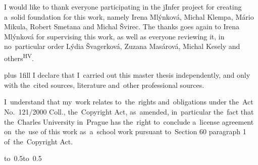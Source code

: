 \documentclass[a4paper,12pt,twoside,openright]{report}
\theoremstyle{definition}
\let\openright=\clearpage
\begin{document}
\newpage %
\openright

\cleardoublepage

\noindent
I would like to thank everyone participating in the jInfer project for creating a~solid foundation for this work, namely Irena Mlýn\-ko\-vá, Mi\-chal Klem\-pa, Má\-rio Mi\-ku\-la, Ro\-bert Sme\-ta\-na and Mi\-chal Švi\-rec. The thanks goes again to Irena Mlýn\-ko\-vá for supervising this work, as well as everyone reviewing it, in no~particular order Lý\-dia Šva\-ger\-ko\-vá, Zu\-za\-na Ma\-sá\-ro\-vá, Mi\-chal Ke\-se\-ly and others\textsuperscript{HV}.

\newpage %
\vglue 0pt plus 1fill
\noindent
I declare that I~carried out this master thesis independently, and only with the~cited sources, literature and~other professional sources.

\medskip\noindent
I~understand that my~work relates to~the~rights and~obligations under the~Act No.~121/2000 Coll., the~Copyright Act, as~amended, in~particular the~fact that the~Charles University in~Prague has the~right to~conclude a~license agreement on~the~use of this work as~a~school work pursuant to~Section 60 paragraph 1 of~the~Copyright Act.

\vspace{10mm}

\hbox{\hbox to 0.5\hbox to 0.5\hsize{%

\hss}}

\vspace{20mm}
\end{document}
